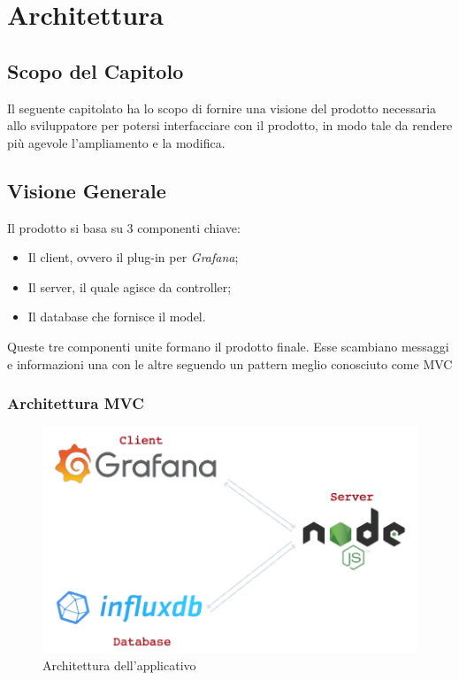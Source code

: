 \section{Architettura}\label{architettura}
\subsection{Scopo del Capitolo}
Il seguente capitolato ha lo scopo di fornire una visione del prodotto necessaria allo sviluppatore per potersi interfacciare con il prodotto, in modo tale da rendere più agevole 
l'ampliamento e la modifica. 


\subsection{Visione Generale}\label{archGenerale}
Il prodotto si basa su 3 componenti chiave: 
\begin{itemize}
	\item Il client, ovvero il plug-in per \textit{Grafana}; 
	\item Il server, il quale agisce da controller; 
	\item Il database che fornisce il model.
\end{itemize}
Queste tre componenti unite formano il prodotto finale. Esse scambiano messaggi e informazioni una con le altre seguendo un pattern meglio conosciuto come MVC\glossario 

\subsubsection{Architettura MVC}
\begin{figure}[H]
	\begin{center}
		\includegraphics[scale=0.5]{./images/architettura.png} 
	\end{center}
	\caption{Architettura dell'applicativo}
\end{figure}

